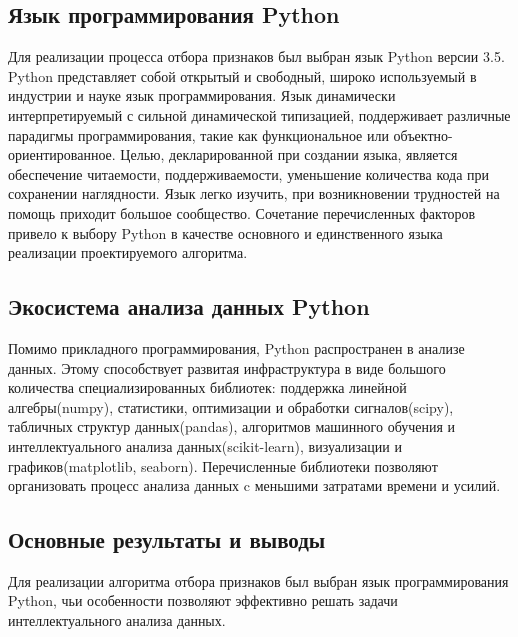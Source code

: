 \subsection{Язык программирования Python}

Для реализации процесса отбора признаков был выбран язык Python версии 3.5. Python представляет собой открытый и свободный, широко используемый в индустрии и науке язык программирования. Язык динамически интерпретируемый с сильной динамической типизацией, поддерживает различные парадигмы программирования, такие как функциональное или объектно-ориентированное. Целью, декларированной при создании языка, является обеспечение читаемости, поддерживаемости, уменьшение количества кода при сохранении наглядности. Язык легко изучить, при возникновении трудностей на помощь приходит большое сообщество. Сочетание перечисленных факторов привело к выбору Python в качестве основного и единственного языка реализации проектируемого алгоритма.

\subsection{Экосистема анализа данных Python}

Помимо прикладного программирования, Python распространен в анализе данных. Этому способствует развитая инфраструктура в виде большого количества специализированных библиотек: поддержка линейной алгебры(numpy), статистики, оптимизации и обработки сигналов(scipy), табличных структур данных(pandas), алгоритмов машинного обучения и интеллектуального анализа данных(scikit-learn), визуализации и графиков(matplotlib, seaborn).  Перечисленные библиотеки позволяют организовать процесс анализа данных c меньшими затратами времени и усилий.  

\subsection{Основные результаты и выводы}
Для реализации алгоритма отбора признаков был выбран язык программирования Python, чьи особенности позволяют эффективно решать задачи интеллектуального анализа данных.